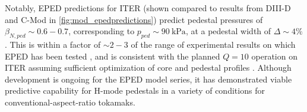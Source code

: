 \begin{figure}[ht]
 \pushtooutside
\end{figure}

\noindent Notably, EPED predictions for ITER (shown compared to results from DIII-D and C-Mod \cite{Hughes2013} in \cref{fig:mod_epedpredictions}) predict pedestal pressures of $\beta_{N,ped} \sim 0.6-0.7$, corresponding to $p_{ped} \sim \SI{90}{\kilo\pascal}$, at a pedestal width of $\Delta \sim 4\%$ \cite{Snyder2009a,Snyder2011}.  This is within a factor of $\sim 2-3$ of the range of experimental results on which EPED has been tested \cite{Walk2012,Hughes2013}, and is consistent with the planned $Q=10$ operation on ITER assuming sufficient optimization of core and pedestal profiles \cite{Snyder2011,Snyder2012}.  Although development is ongoing for the EPED model series, it has demonstrated viable predictive capability for H-mode pedestals in a variety of conditions for conventional-aspect-ratio tokamaks.\nicechapterending



